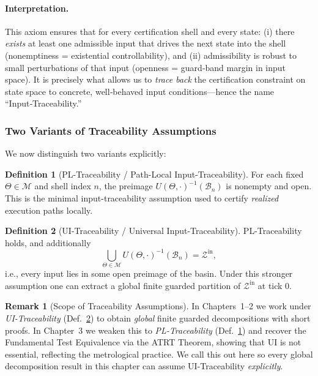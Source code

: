 \documentclass[12pt]{article}
\theoremstyle{definition}
\newtheorem{definition}{Definition}[section]
\newtheorem{remark}{Remark}[section]
\theoremstyle{plain}
\begin{document}
\paragraph{Interpretation.} 
This axiom ensures that for every certification shell and every state:
(i) there \emph{exists} at least one admissible input that drives the next state into the shell (nonemptiness = existential controllability), and 
(ii) admissibility is robust to small perturbations of that input (openness = guard‑band margin in input space).  
It is precisely what allows us to \emph{trace back} the certification constraint on state space to concrete, well‑behaved input conditions—hence the name “Input‑Traceability.”

\subsubsection*{Two Variants of Traceability Assumptions}

We now distinguish two variants explicitly:

\begin{definition}[PL-Traceability / Path-Local Input-Traceability]
\label{pl-traceability}
For each fixed \(\Theta\in\mathcal M\) and shell index \(n\), the preimage \(U(\Theta,\cdot)^{-1}(\mathcal B_n)\) is nonempty and open. This is the minimal input-traceability assumption used to certify \emph{realized} execution paths locally.
\end{definition}

\begin{definition}[UI-Traceability / Universal Input-Traceability]
\label{def:ui-traceability}
PL-Traceability holds, and additionally
\[
\bigcup_{\Theta\in\mathcal M} U(\Theta,\cdot)^{-1}(\mathcal B_n)=\mathcal Z^{\mathrm{in}},
\]
i.e., every input lies in some open preimage of the basin. Under this stronger assumption one can extract a global finite guarded partition of \(\mathcal Z^{\mathrm{in}}\) at tick 0.
\end{definition}
\begin{remark}[Scope of Traceability Assumptions]
In Chapters~1--2 we work under \emph{UI-Traceability} (Def.~\ref{def:ui-traceability}) to obtain \emph{global} finite guarded decompositions with short proofs. In Chapter~3 we weaken this to \emph{PL-Traceability} (Def.~\ref{pl-traceability}) and recover the Fundamental Test Equivalence via the ATRT Theorem, showing that UI is not essential, reflecting the metrological practice. We call this out here so every global decomposition result in this chapter can assume UI-Traceability \emph{explicitly}.
\end{remark}
\end{document}
